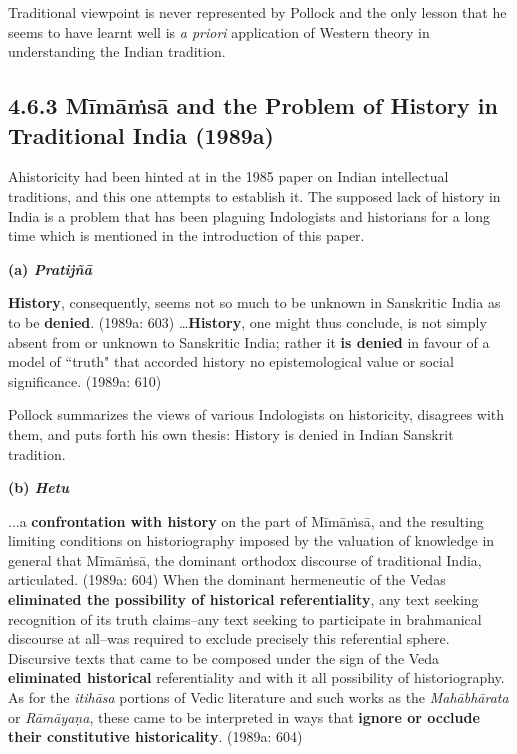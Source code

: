 Traditional viewpoint is never represented by Pollock and the only lesson that he seems to have learnt well is \textit{a priori} application of Western theory in understanding the Indian tradition.

\vspace{-.3cm}

\subsection*{4.6.3 Mīmāṁsā and the Problem of History in Traditional India (1989a)}

\vspace{-.3cm}

Ahistoricity had been hinted at in the 1985 paper on Indian intellectual traditions, and this one attempts to establish it. The supposed lack of history in India is a problem that has been plaguing Indologists and historians for a long time which is mentioned in the introduction of this paper.

\textbf{(a) \textit{Pratijñā }}

\begin{myquote}
\textbf{History}, consequently, seems not so much to be unknown in Sanskritic India as to be \textbf{denied}. (1989a: 603) …\textbf{History}, one might thus conclude, is not simply absent from or unknown to Sanskritic India; rather it \textbf{is denied} in favour of a model of ``truth" that accorded history no epistemological value or social significance. (1989a: 610)
\end{myquote}

Pollock summarizes the views of various Indologists on historicity, disagrees with them, and puts forth his own thesis: History is denied in Indian Sanskrit tradition.

\textbf{(b) \textit{Hetu}}

\begin{myquote}
...a \textbf{confrontation with history} on the part of Mīmāṁsā, and the resulting limiting conditions on historiography imposed by the valuation of knowledge in general that Mīmāṁsā, the dominant orthodox discourse of traditional India, articulated. (1989a: 604) When the dominant hermeneutic of the Vedas \textbf{eliminated the possibility of historical referentiality}, any text seeking recognition of its truth claims–any text seeking to participate in brahmanical discourse at all–was required to exclude precisely this referential sphere. Discursive texts that came to be composed under the sign of the Veda \textbf{eliminated historical} referentiality and with it all possibility of historiography. As for the \textit{itihāsa} portions of Vedic literature and such works as the \textit{Mahābhārata} or \textit{Rāmāyaṇa}, these came to be interpreted in ways that \textbf{ignore or occlude their constitutive historicality}. (1989a: 604)
\end{myquote}

